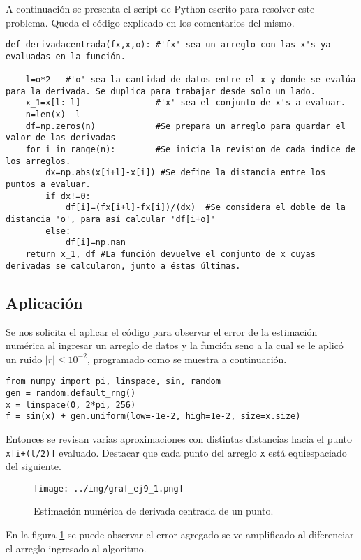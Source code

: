 \documentclass[../portafolio.tex]{subfiles}
\begin{document}
A continuación se presenta el script de Python escrito para resolver este problema. Queda el código explicado en los comentarios del mismo.
\begin{verbatim}
def derivadacentrada(fx,x,o): #'fx' sea un arreglo con las x's ya evaluadas en la función.
    
    l=o*2   #'o' sea la cantidad de datos entre el x y donde se evalúa para la derivada. Se duplica para trabajar desde solo un lado.
    x_1=x[l:-l]               #'x' sea el conjunto de x's a evaluar.
    n=len(x) -l
    df=np.zeros(n)            #Se prepara un arreglo para guardar el valor de las derivadas
    for i in range(n):        #Se inicia la revision de cada indice de los arreglos.
        dx=np.abs(x[i+l]-x[i]) #Se define la distancia entre los puntos a evaluar.
        if dx!=0:
            df[i]=(fx[i+l]-fx[i])/(dx)  #Se considera el doble de la distancia 'o', para así calcular 'df[i+o]'
        else:
            df[i]=np.nan
    return x_1, df #La función devuelve el conjunto de x cuyas derivadas se calcularon, junto a éstas últimas.
\end{verbatim}

\subsection{Aplicación}

Se nos solicita el aplicar el código para observar el error de la estimación numérica al ingresar un arreglo de datos y la función seno a la cual se le aplicó un ruido $|r|\leq 10^{-2}$, programado como se muestra a continuación.

\begin{verbatim}
from numpy import pi, linspace, sin, random
gen = random.default_rng()
x = linspace(0, 2*pi, 256)
f = sin(x) + gen.uniform(low=-1e-2, high=1e-2, size=x.size)
\end{verbatim}


Entonces se revisan varias aproximaciones con distintas distancias hacia el punto \texttt{x[i+(l/2)]} evaluado. Destacar que cada punto del arreglo \texttt{x} está equiespaciado del siguiente.

\begin{figure}
\centering
\texttt{[image: ../img/graf\_ej9\_1.png]}
\caption{Estimación numérica de derivada centrada de un punto.} \label{g2_ej9:fig:graf_0}
\end{figure}

En la figura \ref{g2_ej9:fig:graf_0} se puede observar el error agregado se ve amplificado al diferenciar el arreglo ingresado al algoritmo.
\end{document}
